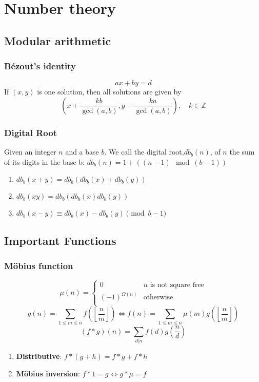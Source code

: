 \chapter{Number theory}

\section{Modular arithmetic}
	\subsection{Bézout's identity}
	$$ax+by=d$$
	If $(x,y)$ is one solution, then all solutions are given by
	$$\left(x+\frac{kb}{\gcd(a,b)}, y-\frac{ka}{\gcd(a,b)}\right), \quad k\in\mathbb{Z}$$

	
	\subsection{Digital Root}
	Given an integer $n$ and a base $b$. We call the digital root,$db_b(n)$, of $n$ the sum of its digits in the base b:
	$db_b(n) = 1 + ((n-1) \mod (b-1))$
	\begin{enumerate}
		\item $db_b(x+y) = db_b(db_b(x)+db_b(y))$
		\item $db_b(xy) = db_b(db_b(x)db_b(y))$
		\item $db_b(x-y) \equiv db_b(x)-db_b(y) \pmod{b-1}$
	\end{enumerate}

\section{Important Functions}
 \subsection{Möbius function}
\[
	\mu(n) = \begin{cases} 0 & n \textrm{ is not square free}\\ (-1)^{\Omega(n)} & \textrm{otherwise}\\\end{cases}
\]
 \[ g(n) = \sum_{1 \leq m \leq n} f\left(\left\lfloor\frac{n}{m}\right \rfloor \right) \Leftrightarrow f(n) = \sum_{1\leq m\leq n} \mu(m)g\left(\left\lfloor\frac{n}{m}\right\rfloor\right)\]
 \[(f*g)(n)= \sum_{d|n}f(d)g\left(\frac{n}{d}\right)\]
 \begin{enumerate}
	\item \textbf{Distributive}: $f*(g+h) = f*g + f*h$
	\item \textbf{Möbius inversion}: $f*1=g \iff g*\mu=f$
 \end{enumerate}

